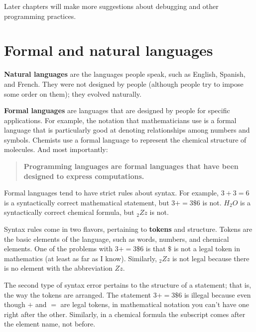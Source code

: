 \documentclass[10pt]{book}
\begin{document}

Later chapters will make more suggestions about debugging and other programming practices.

\section{Formal and natural languages}

{\bf Natural languages} are the languages people speak, such as English, Spanish, and French.  They were not 
designed by people (although people try to impose some order on them); they evolved naturally.

{\bf Formal languages} are languages that are designed by people for specific applications.  For example, the 
notation that mathematicians use is a formal language that is particularly good at denoting relationships 
among numbers and symbols.  Chemists use a formal language to represent the chemical structure of molecules.  
And most importantly:

\begin{quote}
{\bf Programming languages are formal languages that have been designed to express computations.}
\end{quote}

Formal languages tend to have strict rules about syntax.  For example, $3 + 3 = 6$ is a syntactically correct 
mathematical statement, but $3 + = 3 \mbox{\$} 6$ is not.  $H_2O$ is a syntactically correct chemical formula, 
but $_2Zz$ is not.

Syntax rules come in two flavors, pertaining to {\bf tokens} and structure.  Tokens are the basic elements of 
the language, such as words, numbers, and chemical elements.  One of the problems with $3 + = 3 \mbox{\$} 6$ 
is that $\$$ is not a legal token in mathematics (at least as far as I know).  Similarly, $_2Zz$ is not legal 
because there is no element with the abbreviation $Zz$.


The second type of syntax error pertains to the structure of a statement; that is, the way the tokens are 
arranged.  The statement $3 + = 3 \mbox{\$} 6$ is illegal because even though $+$ and $=$ are legal tokens,
in mathematical notation you can't have one right after the other.  Similarly, in a chemical formula the
subscript comes after the element name, not before.
\end{document}
